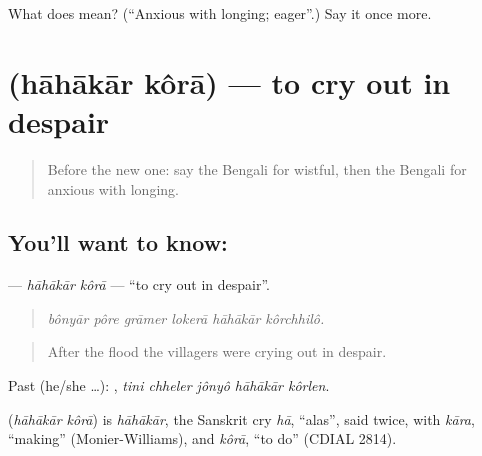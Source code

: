 \begin{tcolorbox}[breakable,colback=teal!4,colframe=teal!35!black,title={Before you move on}]
What does  mean? (\textquotedblleft{}Anxious with longing; eager\textquotedblright{}.) Say it once more.
\end{tcolorbox}
\section[\texorpdfstring{\bn{হাহাকার} \bn{করা} (hāhākār kôrā)}{হাহাকার করা (hāhākār kôrā)}]{  (hāhākār kôrā) — to cry out in despair}

\label{lesson:BN-C448-hahakar-kora}



\begin{quote}
Before the new one: say the Bengali for wistful, then the Bengali for anxious with longing.
\end{quote}

\subsection*{You'll want to know:  }
\textbf{ } — \emph{hāhākār kôrā} — \textquotedblleft{}to cry out in despair\textquotedblright{}.

\begin{quote}
     
\end{quote}

\begin{quote}
\emph{bônyār pôre grāmer lokerā hāhākār kôrchhilô.}
\end{quote}

\begin{quote}
After the flood the villagers were crying out in despair.
\end{quote}

Past (he/she …):     , \emph{tini chheler jônyô hāhākār kôrlen}.

\begin{cousinweb}
\textbf{ } (\emph{hāhākār kôrā}) is \emph{hāhākār}, the Sanskrit cry \emph{hā}, \textquotedblleft{}alas\textquotedblright{}, said twice, with \emph{kāra}, \textquotedblleft{}making\textquotedblright{} (Monier-Williams), and \emph{kôrā}, \textquotedblleft{}to do\textquotedblright{} (CDIAL 2814).
\end{cousinweb}

